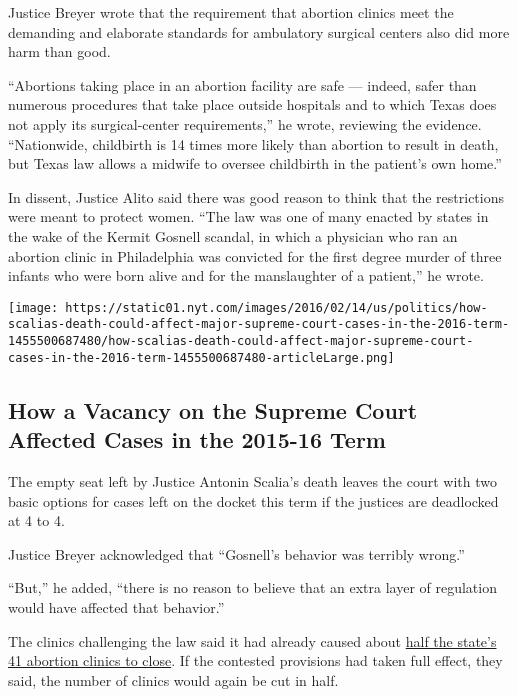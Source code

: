 Justice Breyer wrote that the requirement that abortion clinics meet the
demanding and elaborate standards for ambulatory surgical centers also
did more harm than good.

``Abortions taking place in an abortion facility are safe --- indeed,
safer than numerous procedures that take place outside hospitals and to
which Texas does not apply its surgical-center requirements,'' he wrote,
reviewing the evidence. ``Nationwide, childbirth is 14 times more likely
than abortion to result in death, but Texas law allows a midwife to
oversee childbirth in the patient's own home.''

In dissent, Justice Alito said there was good reason to think that the
restrictions were meant to protect women. ``The law was one of many
enacted by states in the wake of the Kermit Gosnell scandal, in which a
physician who ran an abortion clinic in Philadelphia was convicted for
the first degree murder of three infants who were born alive and for the
manslaughter of a patient,'' he wrote.

\href{https://www.nytimes.com/interactive/2016/02/14/us/politics/how-scalias-death-could-affect-major-supreme-court-cases-in-the-2016-term.html}{}

\texttt{[image: https://static01.nyt.com/images/2016/02/14/us/politics/how-scalias-death-could-affect-major-supreme-court-cases-in-the-2016-term-1455500687480/how-scalias-death-could-affect-major-supreme-court-cases-in-the-2016-term-1455500687480-articleLarge.png]}

\hypertarget{how-a-vacancy-on-the-supreme-court-affected-cases-in-the-2015-16-term}{%
\subsection{How a Vacancy on the Supreme Court Affected Cases in the
2015-16
Term}\label{how-a-vacancy-on-the-supreme-court-affected-cases-in-the-2015-16-term}}

The empty seat left by Justice Antonin Scalia's death leaves the court
with two basic options for cases left on the docket this term if the
justices are deadlocked at 4 to 4.

Justice Breyer acknowledged that ``Gosnell's behavior was terribly
wrong.''

``But,'' he added, ``there is no reason to believe that an extra layer
of regulation would have affected that behavior.''

The clinics challenging the law said it had already caused about
\href{http://www.nytimes.com/interactive/2014/08/04/us/shrinking-number-of-abortion-clinics-in-texas.html}{half
the state's 41 abortion clinics to close}. If the contested provisions
had taken full effect, they said, the number of clinics would again be
cut in half.

